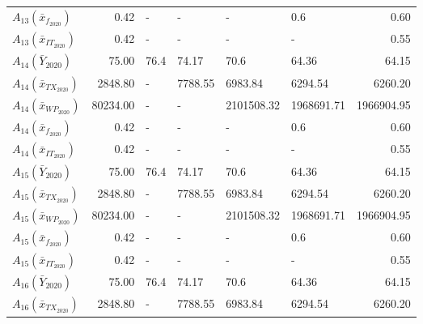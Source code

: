 \begin{tabular}{lrllllr}
 $A_{13}(\bar{x}_{f_{2020}})$ &     0.42 &                   - &                   - &                   - &                 0.6 &                 0.60 \\
$A_{13}(\bar{x}_{IT_{2020}})$ &     0.42 &                   - &                   - &                   - &                   - &                 0.55 \\
     $A_{14}(\bar{Y}_{2020})$ &    75.00 &                76.4 &               74.17 &                70.6 &               64.36 &                64.15 \\
$A_{14}(\bar{x}_{TX_{2020}})$ &  2848.80 &                   - &             7788.55 &             6983.84 &             6294.54 &              6260.20 \\
$A_{14}(\bar{x}_{WP_{2020}})$ & 80234.00 &                   - &                   - &          2101508.32 &          1968691.71 &           1966904.95 \\
 $A_{14}(\bar{x}_{f_{2020}})$ &     0.42 &                   - &                   - &                   - &                 0.6 &                 0.60 \\
$A_{14}(\bar{x}_{IT_{2020}})$ &     0.42 &                   - &                   - &                   - &                   - &                 0.55 \\
     $A_{15}(\bar{Y}_{2020})$ &    75.00 &                76.4 &               74.17 &                70.6 &               64.36 &                64.15 \\
$A_{15}(\bar{x}_{TX_{2020}})$ &  2848.80 &                   - &             7788.55 &             6983.84 &             6294.54 &              6260.20 \\
$A_{15}(\bar{x}_{WP_{2020}})$ & 80234.00 &                   - &                   - &          2101508.32 &          1968691.71 &           1966904.95 \\
 $A_{15}(\bar{x}_{f_{2020}})$ &     0.42 &                   - &                   - &                   - &                 0.6 &                 0.60 \\
$A_{15}(\bar{x}_{IT_{2020}})$ &     0.42 &                   - &                   - &                   - &                   - &                 0.55 \\
     $A_{16}(\bar{Y}_{2020})$ &    75.00 &                76.4 &               74.17 &                70.6 &               64.36 &                64.15 \\
$A_{16}(\bar{x}_{TX_{2020}})$ &  2848.80 &                   - &             7788.55 &             6983.84 &             6294.54 &              6260.20 \\

\end{tabular}
